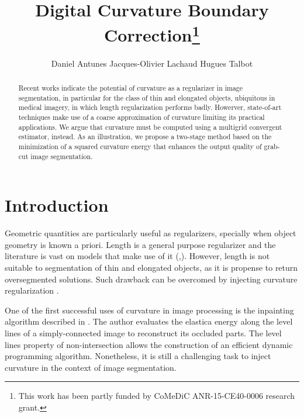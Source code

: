 \documentclass[runningheads]{llncs}
\begin{document}
%
\title{Digital Curvature Boundary Correction\thanks{This  work has  been  partly  funded by CoMeDiC ANR-15-CE40-0006 research grant.}}

\author{Daniel Antunes
Jacques-Olivier Lachaud
Hugues Talbot}
%
%
%
\maketitle              %
%
\begin{abstract}
Recent works indicate the potential of curvature as a regularizer in image segmentation, in particular for the class of thin and elongated objects, ubiquitous in medical imagery, in which length regularization performs badly. Howerver, state-of-art techniques make use of a coarse approximation of curvature  limiting its practical applications. We argue that curvature must be computed using a multigrid convergent estimator, instead. As an illustration, we propose a two-stage method based on the minimization of a squared curvature energy that enhances the output quality of grab-cut image segmentation.
 
\end{abstract}
%
%
%

\section{Introduction}
Geometric quantities are particularly useful as regularizers, specially when object geometry is known a priori. Length is a general purpose regularizer and the literature is vast on models that make use of it (\cite{casseles97},\cite{appleton05}). However, length is not suitable to segmentation of thin and elongated objects, as it is propense to return oversegmented solutions. Such drawback can be overcomed by injecting curvature regularization \cite{zehiry10}.
				
One of the first successful uses of curvature in image processing is the inpainting algorithm described in \cite{masnou98}. The author evaluates the elastica energy along the level lines of a simply-connected image to reconstruct its occluded parts. The level lines property of non-intersection allows the construction of an efficient dynamic programming algorithm. Nonetheless, it is still a challenging task to inject curvature in the context of image segmentation. 
\end{document}
